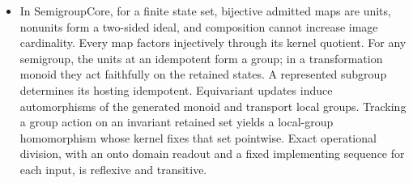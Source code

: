 \documentclass[11pt,a4paper]{article}
\newcommand{\lean}[1]{{\ttfamily\small
  \let\leanunderscore\_\def\_{\leanunderscore\allowbreak}#1}}
\begin{document}
\begin{itemize}[leftmargin=1.4em,itemsep=1pt]
{Checked declarations: \lean{apply\_eq\_iff\_inv\_mul\_mem\_ker}, \lean{apply\_pointwise\_eq\_iff}, \lean{range\_faithful}, \lean{quotientAction\_mk}, \lean{quotientAction\_injective}, \lean{quotientAction\_ker}, \lean{quotientAction\_range}, \lean{flip\_mul\_self}, \lean{c4Action\_apply}, \lean{c4Action\_range}, \lean{c2Action\_range}, \lean{c4Action\_range\_eq\_c2Action\_range}, \lean{c4Action\_ker\_iff}, \lean{c4Action\_ker\_nontrivial}, \lean{c4Action\_ker\_ne\_bot}, \lean{c2Action\_injective}, \lean{c2Action\_ker}, \lean{c4\_not\_isomorphic\_c2}, \lean{fixedCount\_conj}, \lean{transpositionAction\_injective}, \lean{doubleTranspositionAction\_injective}, \lean{transpositionAction\_gen}, \lean{doubleTranspositionAction\_gen}, \lean{transposition\_fixedCount}, \lean{doubleTransposition\_fixedCount}, \lean{c2\_elements}, \lean{transposition\_not\_intertwines\_double}, \lean{run\_conj}, \lean{marked\_run\_conj}, \lean{readout\_conj}, \lean{completion\_conj}, \lean{kernelCon\_iff}, \lean{kernelCon\_iff\_pointwise}, \lean{mrange\_faithful}, \lean{quotientMonoidAction\_mk}, \lean{quotientMonoidAction\_injective}, \lean{quotientMonoidAction\_mrange}.\par}
\item {\raggedright In \lean{SemigroupCore}, for a finite state set, bijective admitted maps are units, nonunits form a two-sided ideal, and composition cannot increase image cardinality. Every map factors injectively through its kernel quotient. For any semigroup, the units at an idempotent form a group; in a transformation monoid they act faithfully on the retained states. A represented subgroup determines its hosting idempotent. Equivariant updates induce automorphisms of the generated monoid and transport local groups. Tracking a group action on an invariant retained set yields a local-group homomorphism whose kernel fixes that set pointwise. Exact operational division, with an onto domain readout and a fixed implementing sequence for each input, is reflexive and transitive.
}
\end{itemize}
\end{document}
